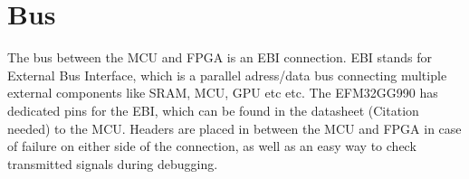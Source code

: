 \documentclass[../main/report.tex]{subfiles}
\begin{document}
\section{Bus}
The bus between the MCU and FPGA is an EBI connection.
EBI stands for External Bus Interface, which is a parallel adress/data bus connecting multiple external components like SRAM, MCU, GPU etc etc.
The EFM32GG990 has dedicated pins for the EBI, which can be found in the datasheet (Citation needed) to the MCU.
Headers are placed in between the MCU and FPGA in case of failure on either side of the connection, as well as an easy way to check transmitted signals during debugging.
\end{document}
